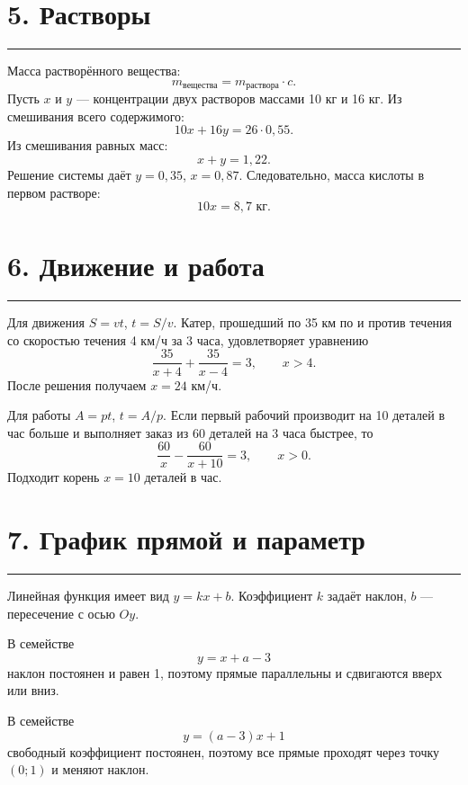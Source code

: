 \documentclass[a4paper,12pt]{article}
\newcommand{\sectionline}{\par\noindent\textcolor{accent}{\rule{\linewidth}{0.6pt}}\par}
\begin{document}
\section*{5. Растворы}\sectionline
Масса растворённого вещества:
\[m_{\text{вещества}}=m_{\text{раствора}}\cdot c.\]
Пусть \(x\) и \(y\) — концентрации двух растворов массами 10 кг и 16 кг. Из смешивания всего содержимого:
\[10x+16y=26\cdot0{,}55.\]
Из смешивания равных масс:
\[x+y=1{,}22.\]
Решение системы даёт \(y=0{,}35\), \(x=0{,}87\). Следовательно, масса кислоты в первом растворе:
\[10x=8{,}7\text{ кг}.\]
\section*{6. Движение и работа}\sectionline
Для движения \(S=vt\), \(t=S/v\). Катер, прошедший по 35 км по и против течения со скоростью течения 4 км/ч за 3 часа, удовлетворяет уравнению
\[\frac{35}{x+4}+\frac{35}{x-4}=3,\qquad x>4.\]
После решения получаем \(x=24\) км/ч.

Для работы \(A=pt\), \(t=A/p\). Если первый рабочий производит на 10 деталей в час больше и выполняет заказ из 60 деталей на 3 часа быстрее, то
\[\frac{60}{x}-\frac{60}{x+10}=3,\qquad x>0.\]
Подходит корень \(x=10\) деталей в час.
\clearpage
\section*{7. График прямой и параметр}\sectionline
Линейная функция имеет вид \(y=kx+b\). Коэффициент \(k\) задаёт наклон, \(b\) — пересечение с осью \(Oy\).

В семействе
\[y=x+a-3\]
наклон постоянен и равен 1, поэтому прямые параллельны и сдвигаются вверх или вниз.

В семействе
\[y=(a-3)x+1\]
свободный коэффициент постоянен, поэтому все прямые проходят через точку \((0;1)\) и меняют наклон.
\begin{center}\end{center}
\clearpage
\end{document}
